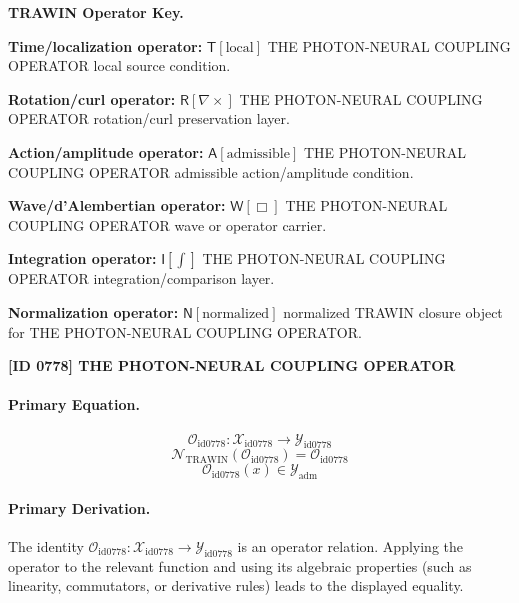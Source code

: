 \par\vspace{0.45\baselineskip}
\noindent\begin{minipage}[t]{\linewidth}
\begingroup
\small
\raggedright
\textbf{TRAWIN Operator Key.}\par
\noindent\textbf{Time/localization operator:} $\mathsf{T}\!\left[\mathrm{local}\right]$ THE PHOTON-NEURAL COUPLING OPERATOR local source condition.\par
\noindent\textbf{Rotation/curl operator:} $\mathsf{R}\!\left[\nabla\times\right]$ THE PHOTON-NEURAL COUPLING OPERATOR rotation/curl preservation layer.\par
\noindent\textbf{Action/amplitude operator:} $\mathsf{A}\!\left[\mathrm{admissible}\right]$ THE PHOTON-NEURAL COUPLING OPERATOR admissible action/amplitude condition.\par
\noindent\textbf{Wave/d'Alembertian operator:} $\mathsf{W}\!\left[\Box\right]$ THE PHOTON-NEURAL COUPLING OPERATOR wave or operator carrier.\par
\noindent\textbf{Integration operator:} $\mathsf{I}\!\left[\int\right]$ THE PHOTON-NEURAL COUPLING OPERATOR integration/comparison layer.\par
\noindent\textbf{Normalization operator:} $\mathsf{N}\!\left[\mathrm{normalized}\right]$ normalized TRAWIN closure object for THE PHOTON-NEURAL COUPLING OPERATOR.\par
\endgroup
\end{minipage}

\clearpage
\noindent\textbf{[ID 0778] THE PHOTON-NEURAL COUPLING OPERATOR}\par
\vspace{0.35em}
\paragraph{Primary Equation.}
\[
\mathcal{O}_{\mathrm{id0778}}:\mathcal{X}_{\mathrm{id0778}}\longrightarrow\mathcal{Y}_{\mathrm{id0778}}
\]
\[
\mathcal{N}_{\mathrm{TRAWIN}}(\mathcal{O}_{\mathrm{id0778}})=\mathcal{O}_{\mathrm{id0778}}
\]
\[
\mathcal{O}_{\mathrm{id0778}}(x)\in\mathcal{Y}_{\mathrm{adm}}
\]

\paragraph{Primary Derivation.}
The identity \( \mathcal{O}_{\mathrm{id0778}}:\mathcal{X}_{\mathrm{id0778}}\longrightarrow\mathcal{Y}_{\mathrm{id0778}} \) is an operator relation. Applying the operator to the relevant function and using its algebraic properties (such as linearity, commutators, or derivative rules) leads to the displayed equality.
